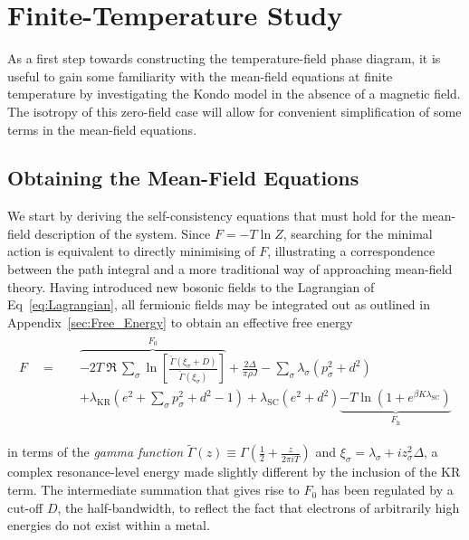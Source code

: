 
\section{Finite-Temperature Study}
\label{sec:finite_temperature}

As a first step towards constructing the temperature-field phase diagram, it is useful to gain some familiarity with the mean-field equations at finite temperature by investigating the Kondo model in the absence of a magnetic field. The isotropy of this zero-field case will allow for convenient simplification of some terms in the mean-field equations.

\subsection{Obtaining the Mean-Field Equations}
\label{subsec:obtaining_MF}

We start by deriving the self-consistency equations that must hold for the mean-field description of the system. Since $ F = - T \ln{Z} $, searching for the minimal action is equivalent to directly minimising of $ F $, illustrating a correspondence between the path integral and a more traditional way of approaching mean-field theory. Having introduced new bosonic fields to the Lagrangian of Eq~\eqref{eq:Lagrangian}, all fermionic fields may be integrated out as outlined in Appendix~\ref{sec:Free_Energy} to obtain an effective free energy
\begin{align}
\begin{split}
F \quad = \quad & \overbrace{- 2 T~\Re~{\sum_{\sigma}\ln{\left[\frac{\widetilde{\Gamma}(\xi_{\sigma} + D)}{\widetilde{\Gamma}(\xi_{\sigma})} \right]}}}^{F_0} + \frac{2 \Delta}{\pi \rho J} - \sum_{\sigma} \lambda_{\sigma} (p_{\sigma}^2 + d^2)\\
&+ \lambda_{\text{KR}} (e^2 + \sum_{\sigma} p_{\sigma}^2 + d^2 - 1) + \lambda_{\text{SC}} (e^2 + d^2) \underbrace{- T \ln{\left( 1 + e^{\beta K \lambda_{\text{SC}}} \right)}}_{F_{\text{h}}}
\label{eq:Free_Energy}
\end{split}
\end{align}

in terms of the \textit{gamma function} $ \widetilde{\Gamma} (z) \equiv \Gamma (\frac{1}{2} + \frac{z}{2 \pi i T}) $ and $ \xi_{\sigma} = \lambda_{\sigma} + i z_{\sigma}^2 \Delta $, a complex resonance-level energy made slightly different by the inclusion of the KR term. The intermediate summation that gives rise to $ F_0 $ has been regulated by a cut-off $ D $, the half-bandwidth, to reflect the fact that electrons of arbitrarily high energies do not exist within a metal.

